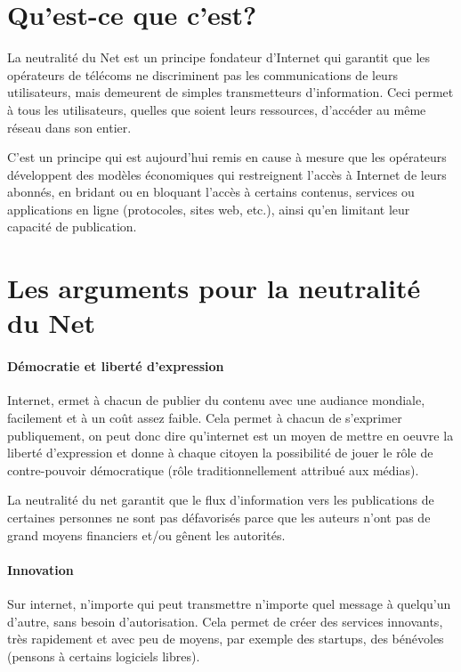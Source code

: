\documentclass[12pt]{../fiche}
\begin{document}

\section{Qu'est-ce que c'est?}\label{kezako}

La neutralité du Net est un principe fondateur d'Internet qui garantit
que les opérateurs de télécoms ne discriminent pas les communications de
leurs utilisateurs, mais demeurent de simples transmetteurs
d'information. Ceci permet à tous les utilisateurs, quelles que
soient leurs ressources, d'accéder au même réseau dans son entier.

C'est un principe qui est aujourd'hui remis en cause à mesure que les
opérateurs développent des modèles économiques qui restreignent l'accès
à Internet de leurs abonnés, en bridant ou en bloquant l'accès à
certains contenus, services ou applications en ligne (protocoles, sites
web, etc.), ainsi qu'en limitant leur capacité de publication.

\section{Les arguments pour la neutralité du Net}

\paragraph{Démocratie et liberté d'expression}
Internet, ermet à chacun de publier du contenu avec une audiance
mondiale, facilement et à un coût assez faible.
Cela permet à chacun de s'exprimer publiquement, on peut donc dire qu'internet
est un moyen de mettre en oeuvre la liberté d'expression et donne à chaque
citoyen la possibilité de jouer le rôle de contre-pouvoir démocratique
(rôle traditionnellement attribué aux médias).

La neutralité du net garantit que le flux d'information vers les publications
de certaines personnes ne sont pas défavorisés parce que les auteurs n'ont pas
de grand moyens financiers et/ou gênent les autorités.

\paragraph{Innovation}
Sur internet, n'importe qui peut transmettre n'importe quel message
à quelqu'un d'autre, sans besoin d'autorisation.
Cela permet de créer des services innovants, très rapidement et avec
peu de moyens, par exemple des startups, des bénévoles (pensons à certains
logiciels libres).
\end{document}
